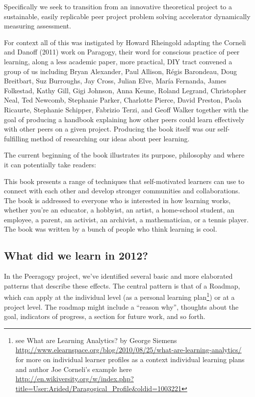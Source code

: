 \documentclass{acm_proc_article-sp}
\begin{document}
Specifically we seek to transition from an innovative theoretical project to a sustainable, easily replicable peer project problem solving accelerator dynamically measuring assessment.

For context all of this was instigated by Howard Rheingold adapting the Corneli and Danoff (2011) work on Paragogy, their word for conscious practice of peer learning, along a less academic paper, more practical, DIY tract convened a group of us including Bryan Alexander, Paul Allison, R\'egis Barondeau, Doug Breitbart, Suz Burroughs, Jay Cross, Julian Elve, Mar\'ia Fernanda, James Folkestad, Kathy Gill, Gigi Johnson, Anna Keune, Roland Legrand, Christopher Neal, Ted Newcomb, Stephanie Parker, Charlotte Pierce, David Preston, Paola Ricaurte, Stephanie Schipper, Fabrizio Terzi, and Geoff Walker together with the goal of producing a handbook explaining how other peers could learn effectively with other peers on a given project. Producing the book itself was our self-fulfilling method of researching our ideas about peer learning.

The current beginning of the book illustrates its purpose, philosophy and where it can potentially take readers:

This book presents a range of techniques that self-motivated learners can use to connect with each other and develop stronger communities and collaborations. The book is addressed to everyone who is interested in how learning works, whether you’re an educator, a hobbyist, an artist, a home-school student, an employee, a parent, an activist, an archivist, a mathematician, or a tennis player.  The book was written by a bunch of people who think learning is cool.

\subsection{What did we learn in 2012?}

In the Peeragogy project, we've identified several basic and more elaborated patterns that describe these effects. The central pattern is that of a Roadmap, which can apply at the individual level (as a personal learning plan\footnote{see What are Learning Analytics? by George Siemens \url{http://www.elearnspace.org/blog/2010/08/25/what-are-learning-analytics/} for more on individual learner profiles as a context individual learning plans and author Joe Corneli's example here \url{http://en.wikiversity.org/w/index.php?title=User:Arided/Paragogical_Profile&oldid=1003221}}) or at a project level. The roadmap might include a ``reason why'', thoughts about the goal, indicators of progress, a section for future work, and so forth. 
\end{document}

